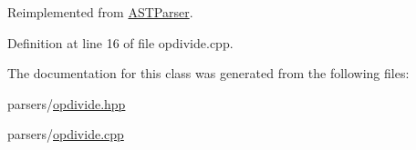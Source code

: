 Reimplemented from \hyperlink{class_a_s_t_parser_ab514c1a1b88592974cb6c2f94f482127}{A\+S\+T\+Parser}.



Definition at line 16 of file opdivide.\+cpp.



The documentation for this class was generated from the following files\+:\begin{DoxyCompactItemize}
\item 
parsers/\hyperlink{opdivide_8hpp}{opdivide.\+hpp}\item 
parsers/\hyperlink{opdivide_8cpp}{opdivide.\+cpp}\end{DoxyCompactItemize}
